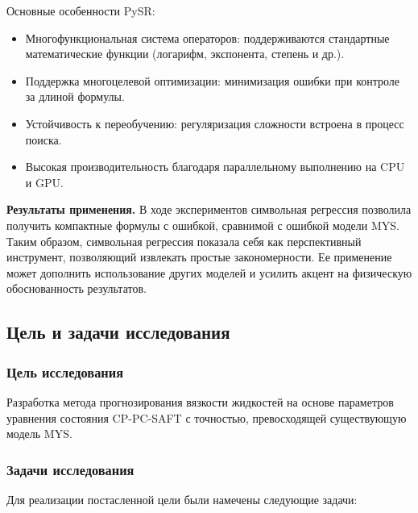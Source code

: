 \documentclass[a4paper,12pt]{article}
\begin{document}
Основные особенности PySR:
\begin{itemize}
  \item Многофункциональная система операторов: поддерживаются стандартные математические функции (логарифм, экспонента, степень и др.).
  \item Поддержка многоцелевой оптимизации: минимизация ошибки при контроле за длиной формулы.
  \item Устойчивость к переобучению: регуляризация сложности встроена в процесс поиска.
  \item Высокая производительность благодаря параллельному выполнению на CPU и GPU.
\end{itemize}

\textbf{Результаты применения.}
В ходе экспериментов символьная регрессия позволила получить компактные формулы с ошибкой, сравнимой с ошибкой модели MYS. Таким образом, символьная регрессия показала себя как перспективный инструмент, позволяющий извлекать простые закономерности. Ее применение может дополнить использование других моделей и усилить акцент на физическую обоснованность результатов.

  \subsection{Цель и задачи исследования}

    \subsubsection{Цель исследования}
    
    Разработка метода прогнозирования вязкости жидкостей на основе параметров уравнения состояния CP-PC-SAFT с точностью, превосходящей существующую модель MYS.
    
    \subsubsection{Задачи исследования}
    
    Для реализации постасленной цели были намечены следующие задачи:
    
\end{document}
